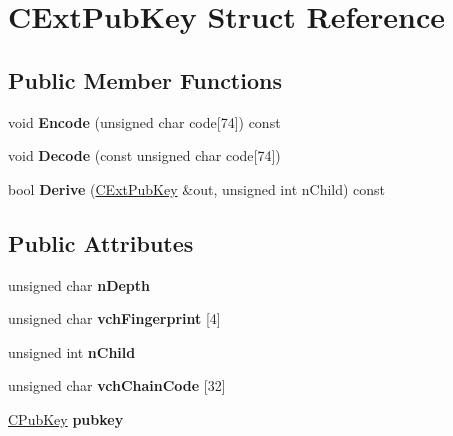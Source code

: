 \hypertarget{struct_c_ext_pub_key}{}\section{C\+Ext\+Pub\+Key Struct Reference}
\label{struct_c_ext_pub_key}
\subsection*{Public Member Functions}
\begin{DoxyCompactItemize}
\item 
\mbox{\label{struct_c_ext_pub_key_a3a2ca2ede05e4b709e0a9a1bcee4de1e}} 
void {\bfseries Encode} (unsigned char code\mbox{[}74\mbox{]}) const
\item 
\mbox{\label{struct_c_ext_pub_key_aa3ca44410ecfa765962d3b97aef61ab5}} 
void {\bfseries Decode} (const unsigned char code\mbox{[}74\mbox{]})
\item 
\mbox{\label{struct_c_ext_pub_key_a2dae8fcc00b9617589dd0b1444f95ec8}} 
bool {\bfseries Derive} (\mbox{\hyperlink{struct_c_ext_pub_key}{C\+Ext\+Pub\+Key}} \&out, unsigned int n\+Child) const
\end{DoxyCompactItemize}
\subsection*{Public Attributes}
\begin{DoxyCompactItemize}
\item 
\mbox{\label{struct_c_ext_pub_key_a58a0724855654eab688cdb00738e3dba}} 
unsigned char {\bfseries n\+Depth}
\item 
\mbox{\label{struct_c_ext_pub_key_a57101a84d16d7897bcec224e488143d9}} 
unsigned char {\bfseries vch\+Fingerprint} \mbox{[}4\mbox{]}
\item 
\mbox{\label{struct_c_ext_pub_key_af816bc2798e9d9aaa94f56af4775d9bf}} 
unsigned int {\bfseries n\+Child}
\item 
\mbox{\label{struct_c_ext_pub_key_a208836888dcc295ca1510de459ca1fc7}} 
unsigned char {\bfseries vch\+Chain\+Code} \mbox{[}32\mbox{]}
\item 
\mbox{\label{struct_c_ext_pub_key_ab18c8520919d20bbfd068565ae566ea8}} 
\mbox{\hyperlink{class_c_pub_key}{C\+Pub\+Key}} {\bfseries pubkey}
\end{DoxyCompactItemize}
